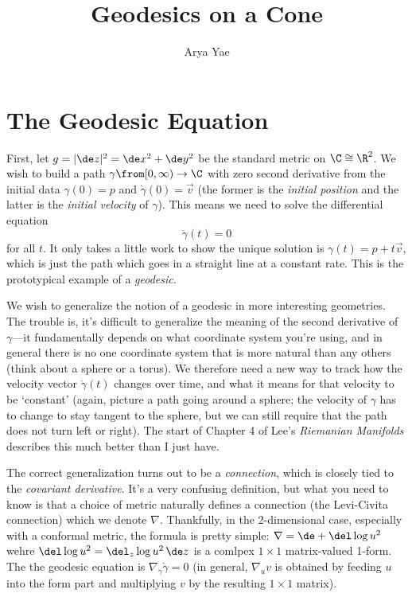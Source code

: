 \documentclass{article}
\title{Geodesics on a Cone}
\author{Arya Yae}
\date{}
\begin{document}
\maketitle

\section*{The Geodesic Equation}
First, let $g=|\de z|^2=\de x^2+\de y^2$ be the standard metric on $\C\cong\R^2$.  We wish to build a path $\gamma\from[0,\infty)\to\C$ with zero second derivative from the initial data $\gamma(0)=p$ and $\dot\gamma(0)=\vec v$ (the former is the \emph{initial position} and the latter is the \emph{initial velocity} of $\gamma$).  This means we need to solve the differential equation
\begin{equation}
    \ddot\gamma(t)=0
\end{equation}
for all $t$.  It only takes a little work to show the unique solution is $\gamma(t)=p+t\vec v$, which is just the path which goes in a straight line at a constant rate.  This is the prototypical example of a \emph{geodesic}.

We wish to generalize the notion of a geodesic in more interesting geometries.  The trouble is, it's difficult to generalize the meaning of the second derivative of $\gamma$---it fundamentally depends on what coordinate system you're using, and in general there is no one coordinate system that is more natural than any others (think about a sphere or a torus).  We therefore need a new way to track how the velocity vector $\dot\gamma(t)$ changes over time, and what it means for that velocity to be `constant' (again, picture a path going around a sphere; the velocity of $\gamma$ has to change to stay tangent to the sphere, but we can still require that the path does not turn left or right).  The start of Chapter 4 of Lee's \emph{Riemanian Manifolds} describes this much better than I just have.

The correct generalization turns out to be a \emph{connection}, which is closely tied to the \emph{covariant derivative}.  It's a very confusing definition, but what you need to know is that a choice of metric naturally defines a connection (the Levi-Civita connection) which we denote $\nabla$.  Thankfully, in the 2-dimensional case, especially with a conformal metric, the formula is pretty simple: $\nabla=\de+\del\log u^2$ wehre $\del\log u^2=\del_z\log u^2\,\de z$ is a comlpex $1\times 1$ matrix-valued 1-form.  The the geodesic equation is $\nabla_{\dot\gamma}\dot\gamma=0$ (in general, $\nabla_uv$ is obtained by feeding $u$ into the form part and multiplying $v$ by the resulting $1\times1$ matrix).
\end{document}
